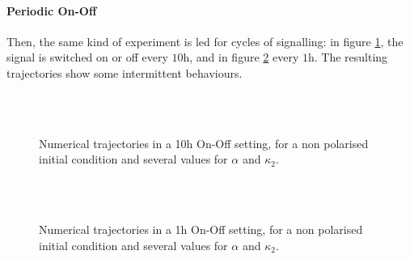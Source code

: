 \documentclass[a4paper,11pt]{article}
\begin{document}
	

\paragraph{Periodic On-Off}
Then, the same kind of experiment is led for cycles of signalling: in figure \ref{fig:OnOff10h}, the signal is switched on or off every $10 \si{\hour}$, and in figure \ref{fig:OnOff1h} every $1\si{\hour}$. The resulting trajectories show some intermittent behaviours.  

\begin{figure}[H]
	\centering
	\quad
	\\	
		\quad
	\\	
	\caption{Numerical trajectories in a 10h On-Off setting, for a non polarised initial condition and several values for $\alpha$ and $\kappa_2$.}\label{fig:OnOff10h}
\end{figure}

\begin{figure}[H]
	\centering
	\quad
	\\	
		\quad
	\\	
	\caption{Numerical trajectories in a 1h On-Off setting, for a non polarised initial condition and several values for $\alpha$ and $\kappa_2$.}\label{fig:OnOff1h}
\end{figure}
\end{document}
